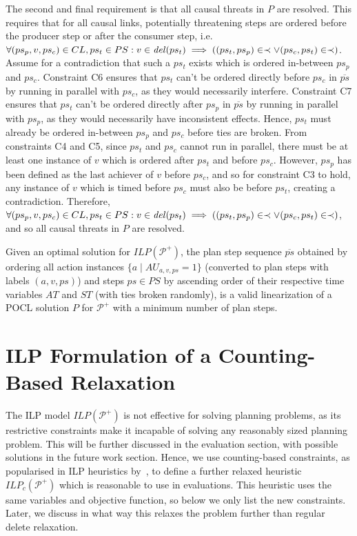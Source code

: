 The second and final requirement is that all causal threats in $P$ are resolved. This requires that for all causal links, potentially threatening steps are ordered before the producer step or after the consumer step, i.e. $\forall (ps_p,v,ps_c)\in CL,ps_t\in PS: v\in\mathit{del}(ps_t)\implies ((ps_t,ps_p)\in\prec\vee(ps_c,ps_t)\in\prec)$. Assume for a contradiction that such a $ps_t$ exists which is ordered in-between $ps_p$ and $ps_c$. Constraint C6 ensures that $ps_t$ can't be ordered directly before $ps_c$ in $\overline{ps}$ by running in parallel with $ps_c$, as they would necessarily interfere. Constraint C7 ensures that $ps_t$ can't be ordered directly after $ps_p$ in $\overline{ps}$ by running in parallel with $ps_p$, as they would necessarily have inconsistent effects. Hence, $ps_t$ must already be ordered in-between $ps_p$ and $ps_c$ before ties are broken. From constraints C4 and C5, since $ps_t$ and $ps_c$ cannot run in parallel, there must be at least one instance of $v$ which is ordered after $ps_t$ and before $ps_c$. However, $ps_p$ has been defined as the last achiever of $v$ before $ps_c$, and so for constraint C3 to hold, any instance of $v$ which is timed before $ps_c$ must also be before $ps_t$, creating a contradiction. Therefore, $\forall (ps_p,v,ps_c)\in CL,ps_t\in PS: v\in\mathit{del}(ps_t)\implies ((ps_t,ps_p)\in\prec\vee(ps_c,ps_t)\in\prec)$, and so all causal threats in $P$ are resolved.\\


\begin{cor}
Given an optimal solution for $\mathit{ILP}(\mathcal{P}^+)$, the plan step sequence $\overline{ps}$ obtained by ordering all action instances $\{a\mid AU_{a,v,ps}=1\}$ (converted to plan steps with labels $(a,v,ps)$) and steps $ps\in PS$ by ascending order of their respective time variables $AT$ and $ST$ (with ties broken randomly), is a valid linearization of a POCL solution $P$ for $\mathcal{P}^+$ with a minimum number of plan steps.
\end{cor}

\section{ILP Formulation of a Counting-Based Relaxation}

The ILP model $\mathit{ILP}(\mathcal{P}^+)$ is not effective for solving planning problems, as its restrictive constraints make it incapable of solving any reasonably sized planning problem. This will be further discussed in the evaluation section, with possible solutions in the future work section. Hence, we use counting-based constraints, as popularised in ILP heuristics by~\cite{Pommerening2014LPHeuristics}, to define a further relaxed heuristic $\mathit{ILP_c}(\mathcal{P}^+)$ which is reasonable to use in evaluations. This heuristic uses the same variables and objective function, so below we only list the new constraints. Later, we discuss in what way this relaxes the problem further than regular delete relaxation.\\



